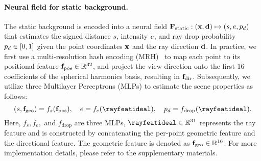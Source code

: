 \paragraph{Neural field for static background.} 
The static background is encoded into a neural field $\mathbf{F}_\text{static}: (\mathbf{x}, \mathbf{d}) \mapsto (s, e, p_d)$ that estimates the signed distance $s$, intensity $e$, and ray drop probability $p_d \in [0,1]$ given the point coordinates $\mathbf{x}$ and the ray direction $\mathbf{d}$. In practice, we first use a multi-resolution hash encoding (MRH)~\cite{mueller2022instant} to map each point to its positional feature $\mathbf{f}_{\text{pos}} \in \mathbb{R}^{32}$, and project the view direction onto the first 16 coefficients of the spherical harmonics basis, resulting in $\mathbf{f}_{\text{dir}}$. Subsequently, we utilize three Multilayer Perceptrons (MLPs) to estimate the scene properties as follows:
\begin{equation}
(s, \geofeat) = f_s(\posfeat), \quad \intensity = f_{\intensity}(\rayfeatideal), \quad \pdrop = f_{\text{drop}}(\rayfeatideal).
\end{equation}
Here, $f_s, f_e,$ and $f_{\text{drop}}$ are three MLPs, $\rayfeatideal \in \mathbb{R}^{31}$ represents the ray feature and is constructed by concatenating the per-point geometric feature and the directional feature. The geometric feature is denoted as $\mathbf{f}_{\text{geo}} \in \mathbb{R}^{16}$. For more implementation details, please refer to the supplementary materials. 



